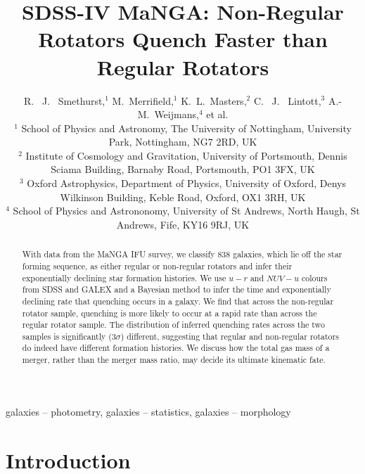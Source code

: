 \documentclass[useAMS,usenatbib]{mn2e}
\begin{document}
\title[Quenching Histories of Regular and Non-Regular Rotators]{SDSS-IV MaNGA: Non-Regular Rotators Quench Faster than Regular Rotators}
\author[Smethurst et al. 2017]{R. ~J. ~Smethurst,$^{1}$ M.~Merrifield,$^{1}$ K.~L.~Masters,$^{2}$  C. ~J. ~Lintott,$^{3}$ \newauthor A.-M.~Weijmans,$^{4}$ et al.
\\ $^1$ School of Physics and Astronomy, The University of Nottingham, University Park, Nottingham, NG7 2RD, UK
\\ $^2$ Institute of Cosmology and Gravitation, University of Portsmouth, Dennis Sciama Building, Barnaby Road, Portsmouth, PO1 3FX, UK 
\\ $^3$ Oxford Astrophysics, Department of Physics, University of Oxford, Denys Wilkinson Building, Keble Road, Oxford, OX1 3RH, UK
\\ $^4$ School of Physics and Astrononomy, University of St Andrews, North Haugh, St Andrews, Fife, KY16 9RJ, UK
}

\maketitle

\begin{abstract}
With data from the MaNGA IFU survey, we classify $838$ galaxies, which lie off the star forming sequence, as either regular or non-regular rotators and infer their exponentially declining star formation histories. We use $u-r$ and $NUV-u$ colours from SDSS and GALEX and a Bayesian method to infer the time and exponentially declining rate that quenching occurs in a galaxy. We find that across the non-regular rotator sample, quenching is more likely to occur at a rapid rate than across the regular rotator sample. The distribution of inferred quenching rates across the two samples is significantly ($3\sigma$) different, suggesting that regular and non-regular rotators do indeed have different formation histories. We discuss how the total gas mass of a merger, rather than the merger mass ratio,	 may decide its ultimate kinematic fate. 
\end{abstract}

\begin{keywords}
galaxies -- photometry, galaxies -- statistics, galaxies -- morphology
\end{keywords}

\section{Introduction}\label{sec:intro}
\end{document}
